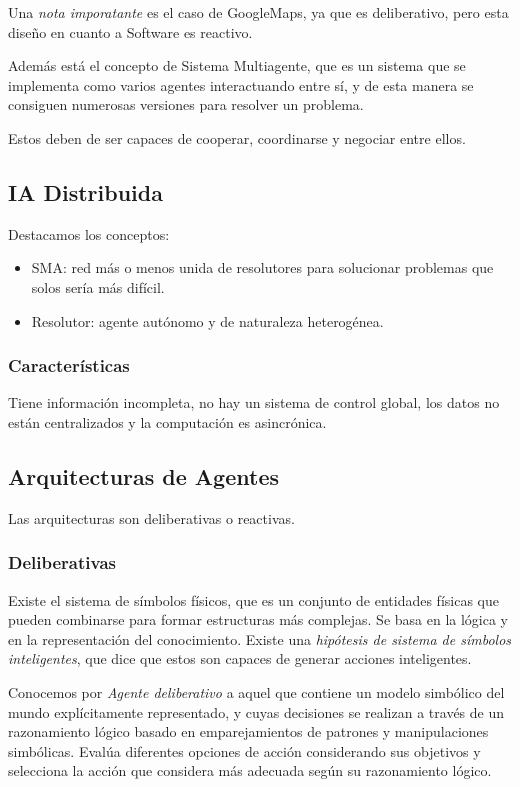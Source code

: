 Una \textit{nota imporatante} es el caso de GoogleMaps, ya que es deliberativo, pero esta diseño en cuanto a Software es reactivo.

Además está el concepto de Sistema Multiagente, que es un sistema que se implementa como varios agentes interactuando entre sí, y de esta manera se consiguen numerosas versiones para resolver un problema.

Estos deben de ser capaces de cooperar, coordinarse y negociar entre ellos.

\subsection{IA Distribuida}

Destacamos los conceptos:
\begin{itemize}
    \item SMA: red más o menos unida de resolutores para solucionar problemas que solos sería más difícil.
    \item Resolutor: agente autónomo y de naturaleza heterogénea.
\end{itemize}

\subsubsection{Características}

Tiene información incompleta, no hay un sistema de control global, los datos no están centralizados y la computación es asincrónica.

\subsection{Arquitecturas de Agentes}

Las arquitecturas son deliberativas o reactivas.

\subsubsection{Deliberativas}

Existe el sistema de símbolos físicos, que es un conjunto de entidades físicas que pueden combinarse para formar estructuras más complejas. Se basa en la lógica y en la representación del conocimiento. Existe una \textit{hipótesis de sistema de símbolos inteligentes}, que dice que estos son capaces de generar acciones inteligentes.

Conocemos por \textit{Agente deliberativo} a  aquel que contiene un modelo simbólico del
mundo explícitamente representado, y cuyas decisiones se realizan a
través de un razonamiento lógico basado en emparejamientos de
patrones y manipulaciones simbólicas. Evalúa diferentes opciones de
acción considerando sus objetivos y selecciona la acción que
considera más adecuada según su razonamiento lógico.

